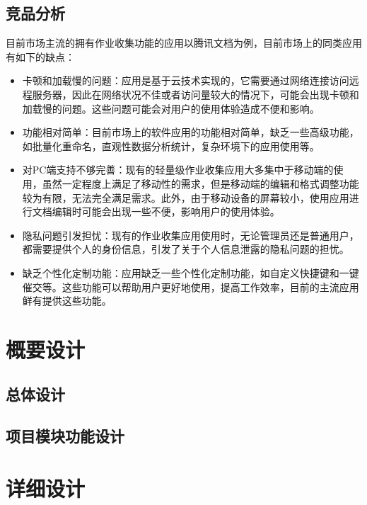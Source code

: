 \documentclass[lang=cn,11pt,a4paper]{elegantpaper}
\begin{document}
\subsection{竞品分析}
目前市场主流的拥有作业收集功能的应用以腾讯文档为例，目前市场上的同类应用有如下的缺点：
\begin{itemize}
	\item 卡顿和加载慢的问题：应用是基于云技术实现的，它需要通过网络连接访问远程服务器，因此在网络状况不佳或者访问量较大的情况下，可能会出现卡顿和加载慢的问题。这些问题可能会对用户的使用体验造成不便和影响。
	
	\item 功能相对简单：目前市场上的软件应用的功能相对简单，缺乏一些高级功能，如批量化重命名，直观性数据分析统计，复杂环境下的应用使用等。
	
	\item  对PC端支持不够完善：现有的轻量级作业收集应用大多集中于移动端的使用，虽然一定程度上满足了移动性的需求，但是移动端的编辑和格式调整功能较为有限，无法完全满足需求。此外，由于移动设备的屏幕较小，使用应用进行文档编辑时可能会出现一些不便，影响用户的使用体验。
	\item 隐私问题引发担忧：现有的作业收集应用使用时，无论管理员还是普通用户，都需要提供个人的身份信息，引发了关于个人信息泄露的隐私问题的担忧。
	\item 缺乏个性化定制功能：应用缺乏一些个性化定制功能，如自定义快捷键和一键催交等。这些功能可以帮助用户更好地使用，提高工作效率，目前的主流应用鲜有提供这些功能。
\end{itemize}






\clearpage
\section{概要设计}


\subsection{总体设计}


\subsection{项目模块功能设计}

\clearpage
\section{详细设计}
\end{document}
